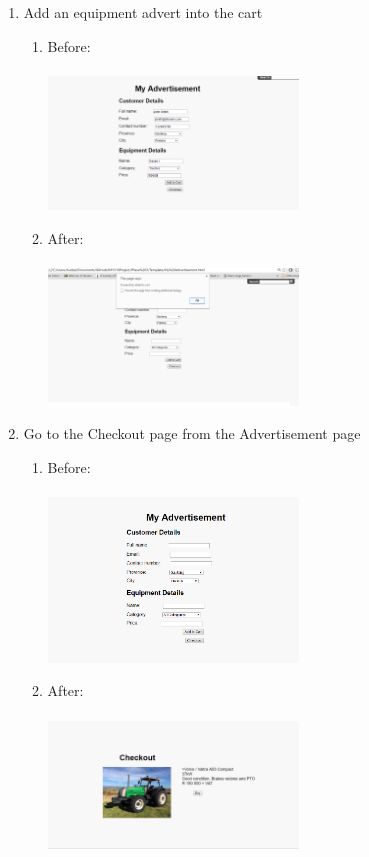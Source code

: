 \documentclass[11pt]{article}
\begin{document}
\begin{enumerate}
\newpage

		\item Add an equipment advert into the cart
			\begin{enumerate}
				\item Before: \\ \\
					 \includegraphics[width=0.55\textwidth]{../Images/Tasks/Task8Before.png}
				\item After: \\ \\
					\includegraphics[width=0.55\textwidth]{../Images/Tasks/Task8After.png}
			\end{enumerate}
				
		\item Go to the Checkout page from the Advertisement page
			\begin{enumerate}
				\item Before: \\ \\
					\includegraphics[width=0.55\textwidth]{../Images/Tasks/Task9Before.png} \newpage
				\item After: \\ \\
					\includegraphics[width=0.55\textwidth]{../Images/Tasks/Task9After.png}
			\end{enumerate}
				

\end{enumerate}
\end{document}
